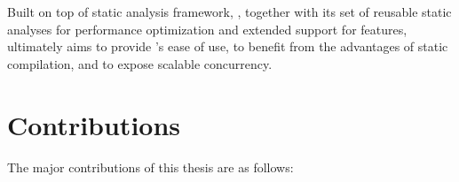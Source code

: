 Built on top of \mclab static analysis framework\cite{JesseThesis, TamerPaper},
\mixten, together with its set of reusable static analyses for performance
optimization and extended support for \matlab features, ultimately aims to
provide \matlab's ease of use, to benefit from the advantages of static 
compilation, and to expose scalable concurrency.  


\section{Contributions}

The major contributions  of this thesis are as follows:

